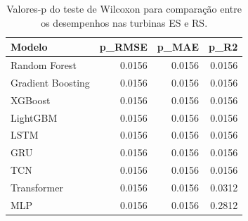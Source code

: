 \begin{table}
\centering
\caption{Valores-p do teste de Wilcoxon para comparação entre os desempenhos nas turbinas ES e RS.}
\label{tab:pvalores_wilcoxon}
\begin{tabular}{lrrr}
\toprule
           Modelo &  p\_RMSE &  p\_MAE &   p\_R2 \\
\midrule
    Random Forest &  0.0156 & 0.0156 & 0.0156 \\
Gradient Boosting &  0.0156 & 0.0156 & 0.0156 \\
          XGBoost &  0.0156 & 0.0156 & 0.0156 \\
         LightGBM &  0.0156 & 0.0156 & 0.0156 \\
             LSTM &  0.0156 & 0.0156 & 0.0156 \\
              GRU &  0.0156 & 0.0156 & 0.0156 \\
              TCN &  0.0156 & 0.0156 & 0.0156 \\
      Transformer &  0.0156 & 0.0156 & 0.0312 \\
              MLP &  0.0156 & 0.0156 & 0.2812 \\
\bottomrule
\end{tabular}
\end{table}
